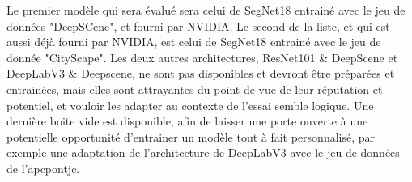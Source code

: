 ﻿\par Le premier modèle qui sera évalué sera celui de SegNet18 entrainé avec le jeu de données "DeepSCene", et fourni par NVIDIA. Le second de la liste, et qui est aussi déjà fourni par NVIDIA, est celui de SegNet18 entrainé avec le jeu de donnée "CityScape". Les deux autres architectures, ResNet101 \& DeepScene et DeepLabV3 \& Deepscene, ne sont pas disponibles et devront être préparées et entrainées, mais elles sont attrayantes du point de vue de leur réputation et potentiel, et vouloir les adapter au contexte de l'essai semble logique. Une dernière boite vide est disponible, afin de laisser une porte ouverte à une potentielle opportunité d'entrainer un modèle tout à fait personnalisé, par exemple une adaptation de l'architecture de DeepLabV3 avec le jeu de données de l'\acrshort{apcpontjc}.